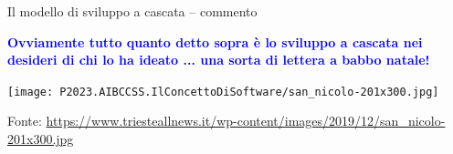 \documentclass{beamer}
\begin{document}
\begin{frame}{\centerline{Il modello di sviluppo a cascata -- commento}}

\textcolor{blue}{\bf Ovviamente tutto quanto detto sopra \`{e} lo sviluppo a cascata nei desideri di chi lo ha ideato ... una sorta di lettera a babbo natale!}

\begin{center}
\texttt{[image: P2023.AIBCCSS.IlConcettoDiSoftware/san\_nicolo-201x300.jpg]}
\end{center}
\vspace{0.5cm}

\begin{center}
\tiny
Fonte: \url{https://www.triesteallnews.it/wp-content/images/2019/12/san_nicolo-201x300.jpg}
\end{center}


\end{frame}
\end{document}
